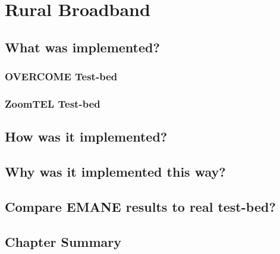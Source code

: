 \chapter{Rural Broadband}
\label{chapter3}


\section{What was implemented?}

\subsection{OVERCOME Test-bed}

\subsection{ZoomTEL Test-bed}

\section{How was it implemented?}

\section{Why was it implemented this way?}

\section{Compare EMANE results to real test-bed?}

\section {Chapter Summary}

